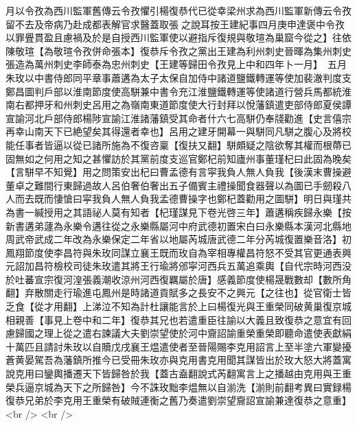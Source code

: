 月以令孜為西川監軍舊傳云令孜懼引楊復恭代已從幸梁州求為西川監軍新傳云令孜留不去及帝病乃赴成都表解官求醫蓋取張之說耳按王建紀事四月庚申達褒中令孜以罪舋貫盈且慮禍及於是自授西川監軍使以避指斥復規與敬瑄為巢窟今從之】往依陳敬瑄【為敬瑄令孜併命張本】復恭斥令孜之黨出王建為利州刺史晉暉為集州刺史張造為萬州刺史李師泰為忠州刺史【王建等歸田令孜見上中和四年卜一月】　五月朱玫以中書侍郎同平章事蕭遘為太子太保自加侍中諸道鹽鐵轉運等使加裴澈判度支鄭昌圖判戶部以淮南節度使高駢兼中書令充江淮鹽鐵轉運等使諸道行營兵馬都統淮南右都押牙和州刺史呂用之為嶺南東道節度使大行封拜以悅藩鎮遣吏部侍郎夏侯譚宣諭河北戶部侍郎楊陟宣諭江淮諸藩鎮受其命者什六七高駢仍奉牋勸進【史言僖宗再幸山南天下已絶望矣其得還者幸也】呂用之建牙開幕一與駢同凡駢之腹心及將校能任事者皆逼以從已諸所施為不復咨稟【復扶又翻】駢頗疑之陰欲奪其權而根蔕已固無如之何用之知之甚懼訪於其黨前度支巡官鄭杞前知廬州事董瑾杞曰此固為晚矣【言駢早不知覺】用之問策安出杞曰曹孟德有言寜我負人無人負我【後漢末曹操避董卓之難間行東歸過故人呂伯奢伯奢出五子備賓主禮操聞食器聲以為圖已手劒殺八人而去既而悽愴曰寜我負人無人負我孟德曹操字也鄭杞蓋勸用之圖駢】明日與瑾共為書一緘授用之其語祕人莫有知者【杞瑾謀見下卷光啓三年】蕭遘稱疾歸永樂【按新書遘弟蘧為永樂令遘往從之永樂縣屬河中府武德初置宋白曰永樂縣本漢河北縣地周武帝武成二年改為永樂保定二年省以地屬芮城唐武德二年分芮城復置樂音洛】初鳳翔節度使李昌符與朱玫同謀立襄王既而玫自為宰相專權昌符怒不受其官更通表興元詔加昌符檢校司徒朱玫遣其將王行瑜將邠寜河西兵五萬追乘輿【自代宗時河西没於吐蕃宣宗復河湟張義潮收涼州河西復羈屬於唐】感義節度使楊晟戰數却【數所角翻】弃散關走行瑜進屯鳳州是時諸道貢賦多之長安不之興元【之往也】從官衛士皆乏食【從才用翻】上涕泣不知為計杜讓能言於上曰楊復光與王重榮同破黄巢復京城相親善【事見上卷中和二年】復恭其兄也若遣重臣往諭以大義且致復恭之意宜有回慮歸國之理上從之遣右諫議大夫劉崇望使於河中齎詔諭重榮重榮即聽命遣使表獻絹十萬匹且請討朱玫以自贖戊戌襄王煴遣使者至晉陽賜李克用詔言上至半塗六軍變擾蒼黄晏駕吾為藩鎮所推今已受冊朱玫亦與克用書克用聞其謀皆出於玫大怒大將蓋寓說克用曰鑾輿播遷天下皆歸咎於我【蓋古盍翻說式芮翻寓言上之播越由克用與王重榮兵逼京城為天下之所歸咎】今不誅玫黜李煴無以自湔洗【湔則前翻考異曰實録楊復恭兄弟於李克用王重榮有破賊連衡之舊乃奏遣劉崇望齎詔宣諭兼達復恭之意重】<br />
<br />
